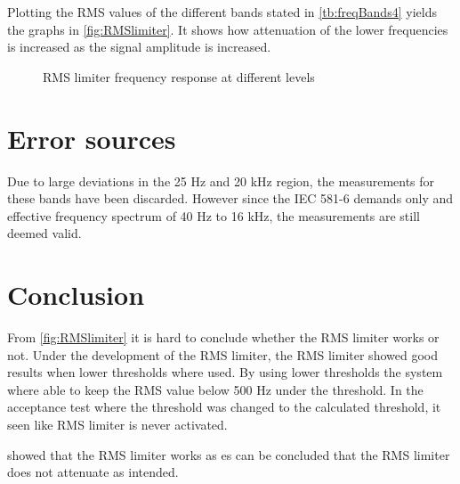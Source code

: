 Plotting the RMS values of the different bands stated in \autoref{tb:freqBands4} yields the graphs in \autoref{fig:RMSlimiter}. It shows how attenuation of the lower frequencies is increased as the signal amplitude is increased.

\begin{figure}[H]
	\centering
	
	\caption{RMS limiter frequency response at different levels}
	\label{fig:RMSlimiter}
\end{figure}


\section{Error sources}

Due to large deviations in the 25 Hz and 20 kHz region, the measurements for these bands have been discarded. However since the IEC 581-6 demands only and effective frequency spectrum of 40 Hz to 16 kHz, the measurements are still deemed valid.

\section{Conclusion}

From \autoref{fig:RMSlimiter} it is hard to conclude whether the RMS limiter works or not. Under the development of the RMS limiter, the RMS limiter showed good results when lower thresholds where used. By using lower thresholds the system where able to keep the RMS value below 500 Hz under the threshold. In the acceptance test where the threshold was changed to the calculated threshold, it seen like RMS limiter is never activated. 


 showed that the RMS limiter works as es can be concluded that the RMS limiter does not attenuate as intended.

